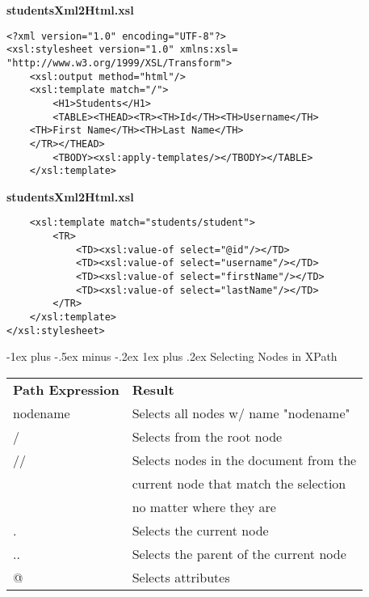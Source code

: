 \documentclass[10pt,landscape]{article}
\makeatletter
\renewcommand{\subsubsection}{\@startsection{subsubsection}{3}{0mm}%
                                {-1ex plus -.5ex minus -.2ex}%
                                {1ex plus .2ex}%
                                {\normalfont\small\bfseries}}
\makeatother
\begin{document}
\begin{multicols}{3}
\textbf{studentsXml2Html.xsl}
\begin{lstlisting}
<?xml version="1.0" encoding="UTF-8"?>
<xsl:stylesheet version="1.0" xmlns:xsl= "http://www.w3.org/1999/XSL/Transform">
	<xsl:output method="html"/>
	<xsl:template match="/">
		<H1>Students</H1>
		<TABLE><THEAD><TR><TH>Id</TH><TH>Username</TH>
    <TH>First Name</TH><TH>Last Name</TH>
    </TR></THEAD>
		<TBODY><xsl:apply-templates/></TBODY></TABLE>
	</xsl:template>
\end{lstlisting}



\textbf{studentsXml2Html.xsl}

\begin{lstlisting}
	<xsl:template match="students/student">
		<TR>
			<TD><xsl:value-of select="@id"/></TD>
			<TD><xsl:value-of select="username"/></TD>
			<TD><xsl:value-of select="firstName"/></TD>
			<TD><xsl:value-of select="lastName"/></TD>
		</TR>
	</xsl:template>
</xsl:stylesheet>
\end{lstlisting}







\subsubsection{Selecting Nodes in XPath}

\begin{tabular}{@{}ll@{}}
 \textbf{Path Expression} & \textbf{Result}\\
nodename & Selects all nodes w/ name "nodename"\\
/ & Selects from the root node\\
// & Selects nodes in the document from the \\
 & current node that match the selection \\
 & no matter where they are\\
. & Selects the current node\\
.. & Selects the parent of the current node\\ 
@ & Selects attributes\\
\end{tabular}


\end{multicols}
\end{document}
